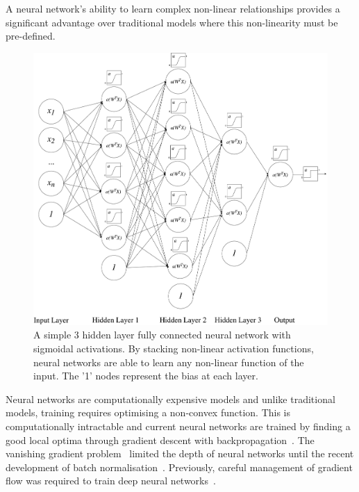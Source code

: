 \documentclass[12pt, twoside]{book}
\begin{document}

\begin{highlight}
A neural network's ability to learn complex non-linear relationships provides a significant advantage over traditional models where this non-linearity must be pre-defined.
\end{highlight}

\begin{figure}[h]
\label{nnetstacked}
\centering\includegraphics[width=1\linewidth]{neuralnet.pdf}
\caption{A simple 3 hidden layer fully connected neural network with sigmoidal activations. By stacking non-linear activation functions, neural networks are able to learn any non-linear function of the input. The '1' nodes represent the bias at each layer.}
\end{figure}


Neural networks are computationally expensive models and unlike traditional models, training requires optimising a non-convex function. This is computationally intractable and current neural networks are trained by finding a good local optima through gradient descent with backpropagation~\cite{convexopt}. The vanishing gradient problem~\cite{vanishinggradient} limited the depth of neural networks until the recent development of batch normalisation~\cite{batchnorm}. Previously, careful management of gradient flow was required to train deep neural networks~\cite{googlenet}. 
\end{document}
